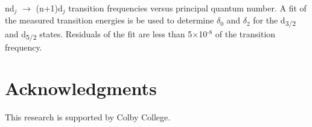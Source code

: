 \documentclass[landscape]{sciposter}
\begin{document}
\begin{multicols}{4}
nd$_j$ $\rightarrow$ (n+1)d$_j$ transition frequencies versus principal quantum number. A fit of the measured transition energies is be used to determine $\delta_0$ and $\delta_2$ for the d\textsubscript{3/2} and d\textsubscript{5/2} states. Residuals of the fit are less than 5$\times$10$^{\text{-8}}$ of the transition frequency.


\section*{\large Acknowledgments}
This research is supported by Colby College.

\end{multicols}
\end{document}
